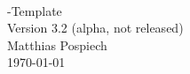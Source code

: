 




\begin{titlepage}
   \mbox{}\vspace{5\baselineskip}\\
   \sffamily\huge
   \centering
   \LaTeXe{}-Template
   \rmfamily\Large
   \vspace{1\baselineskip}\\
   Version 3.2 (alpha, not released)
   \vspace{5\baselineskip}\\
   \rmfamily\Large
   Matthias Pospiech
   \vspace{1\baselineskip}\\
   \today
\end{titlepage}
 



% 
